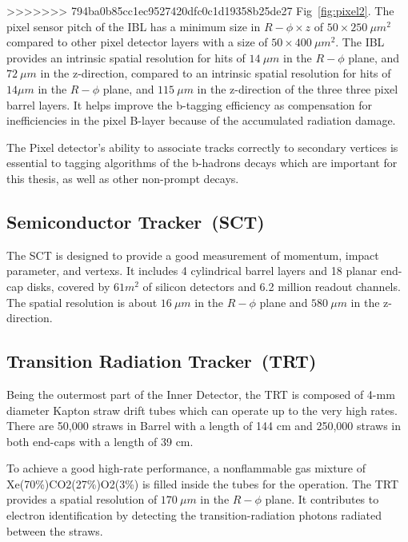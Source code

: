 >>>>>>> 794ba0b85cc1ec9527420dfc0c1d19358b25de27
Fig~\ref{fig:pixel2}. The pixel sensor pitch of the IBL has a minimum size in $R-\phi \times z$ of $50 \times 250~\mu m^2$ compared to other pixel detector layers with a size of $50 \times 400~\mu m^2$. 	 The IBL provides an intrinsic spatial resolution for hits of $14~\mu m$ in the $R-\phi$ plane, and
$72~\mu m$ in the z-direction, compared to an intrinsic spatial resolution for hits of $14\mu m$ in the $R-\phi$ plane, and $115~\mu m$ in the z-direction of the three three pixel barrel layers.
It helps improve the b-tagging efficiency as compensation for inefficiencies in the pixel B-layer because of the accumulated radiation damage.
\par The Pixel detector's ability to associate tracks correctly to secondary vertices is essential to tagging algorithms of the b-hadrons decays which are important for this thesis, as well as other non-prompt decays.
\subsection{Semiconductor Tracker~(SCT)}
The SCT \cite{AHMAD200798} is designed to provide a good measurement of momentum, impact parameter, and vertexs. It includes 4 cylindrical barrel layers and 18 planar end-cap disks, covered by $61 m^2$ of silicon detectors and 6.2 million readout channels. The spatial resolution is about $16~\mu m$ in the $R-\phi$ plane and $580~\mu m$ in the z-direction.

\subsection{Transition Radiation Tracker~(TRT)}


Being the outermost part of the Inner Detector, the TRT \cite{Abat:2008zza} is composed of 4-mm diameter Kapton straw drift tubes which can operate up to the very high rates. There are 50,000 straws in Barrel with a length of 144 cm and 250,000 straws in both end-caps with a length of 39 cm.

To achieve a good high-rate performance, a nonflammable gas mixture of Xe(70\%)CO2(27\%)O2(3\%) is filled inside the tubes for the operation. The TRT provides a spatial resolution of $170~\mu m$ in the $R-\phi$ plane. It contributes to electron identification by detecting the transition-radiation photons radiated between the straws. 

